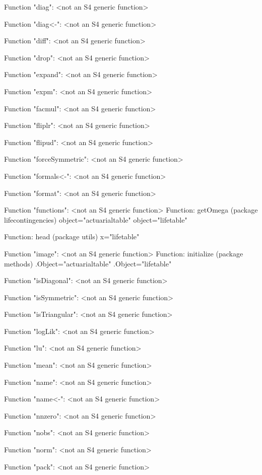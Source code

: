 \documentclass[nojss]{jss}
\begin{document}
\begin{Schunk}
\begin{Soutput}
Function "diag":
 <not an S4 generic function>

Function "diag<-":
 <not an S4 generic function>

Function "diff":
 <not an S4 generic function>

Function "drop":
 <not an S4 generic function>

Function "expand":
 <not an S4 generic function>

Function "expm":
 <not an S4 generic function>

Function "facmul":
 <not an S4 generic function>

Function "fliplr":
 <not an S4 generic function>

Function "flipud":
 <not an S4 generic function>

Function "forceSymmetric":
 <not an S4 generic function>

Function "formals<-":
 <not an S4 generic function>

Function "format":
 <not an S4 generic function>

Function "functions":
 <not an S4 generic function>
Function: getOmega (package lifecontingencies)
object="actuarialtable"
object="lifetable"

Function: head (package utils)
x="lifetable"


Function "image":
 <not an S4 generic function>
Function: initialize (package methods)
.Object="actuarialtable"
.Object="lifetable"


Function "isDiagonal":
 <not an S4 generic function>

Function "isSymmetric":
 <not an S4 generic function>

Function "isTriangular":
 <not an S4 generic function>

Function "logLik":
 <not an S4 generic function>

Function "lu":
 <not an S4 generic function>

Function "mean":
 <not an S4 generic function>

Function "name":
 <not an S4 generic function>

Function "name<-":
 <not an S4 generic function>

Function "nnzero":
 <not an S4 generic function>

Function "nobs":
 <not an S4 generic function>

Function "norm":
 <not an S4 generic function>

Function "pack":
 <not an S4 generic function>


\end{Soutput}
\end{Schunk}
\end{document}
